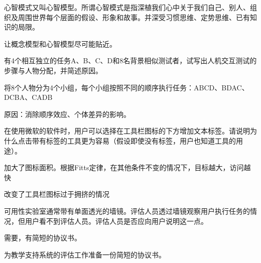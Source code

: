 \begin{solution}
心智模式又叫心智模型。所谓心智模式是指深植我们心中关于我们自己、别人、组织及周围世界每个层面的假设、形象和故事。并深受习惯思维、定势思维、已有知识的局限。

让概念模型和心智模型尽可能贴近。
\end{solution}



\begin{problem}[2015、2016、2021]
有4个相互独立的任务A、B、C、D和8名背景相似测试者，试写出人机交互测试的步骤与人物分配，并简述原因。
\end{problem}

\begin{solution}
将8个人物分为4个小组，每个小组按照不同的顺序执行任务：ABCD、BDAC、DCBA、CADB

原因：消除顺序效应、个体差异的影响。
\end{solution}



\begin{problem}[2012]
在使用微软的软件时，用户可以选择在工具栏图标的下方增加文本标签。请说明为什么点击带有标签的工具更为容易（假设即使没有标签，用户也知道工具的用途）。
\end{problem}

\begin{solution}
加大了图标面积。根据Fitts定律，在其他条件不变的情况下，目标越大，访问越快

改变了工具栏图标过于拥挤的情况
\end{solution}



\begin{problem}[2012]
可用性实验室通常带有单面透光的墙镜。评估人员透过墙镜观察用户执行任务的情况，但用户看不到评估人员。评估人员是否应向用户说明这一点。
\end{problem}

\begin{solution}
需要，有简短的协议书。
\end{solution}



\begin{problem}[2012]
为教学支持系统的评估工作准备一份简短的协议书。
\end{problem}

